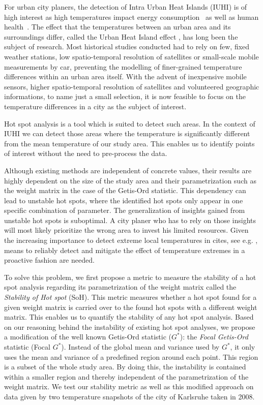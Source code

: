 \documentclass{itatnew}
\begin{document}
For urban city planers, the detection of Intra Urban Heat Islands (IUHI) is of
high interest as high temperatures impact energy
consumption~\cite{Hassid.2001.Electricity_UHI} as well as human
health~\cite{Ye.2012}. The effect that the temperatures between an urban area
and its surroundings differ, called the Urban Heat Island effect
\cite{Oke1982energetic}, has long been the subject of research. Most historical
studies conducted had to rely on few, fixed weather stations, low
spatio-temporal resolution of satellites or small-scale mobile measurements by
car, preventing the modelling of finer-grained temperature differences within an
urban area itself. With the advent of inexpensive mobile sensors, higher
spatio-temporal resolution of satellites and volunteered geographic
informations, to name just a small selection, it is now feasible to focus on the
temperature differences in a city as the subject of interest.

Hot spot analysis is a tool which is suited to detect such areas. In the context
of IUHI we can detect those areas where the temperature is significantly
different from the mean temperature of our study area. This enables us to
identify points of interest without the need to pre-process the data.

Although existing methods are independent of concrete values, their results are
highly dependent on the size of the study area and their parametrization such as
the weight matrix in the case of the Getis-Ord statistic. This dependency can
lead to unstable hot spots, where the identified hot spots only appear in one 
specific combination of parameter. The generalization of insights gained from
unstable hot spots is suboptimal. A city planer who has to rely on those
insights will most likely prioritize the wrong area to invest his limited
resources. Given the increasing importance to detect extreme local temperatures
in cites, see e.g. \cite{Hansen.2010, GRL:GRL22143, department2014world}, means
to reliably detect and mitigate the effect of temperature extremes in a
proactive fashion are needed.

To solve this problem, we first propose a metric to measure the stability of a
hot spot analysis regarding its parametrization of the weight matrix called the
\emph{Stability of Hot spot} (SoH). This metric measures whether a hot spot
found for a given weight matrix is carried over to the found hot spots with a
different weight matrix. This enables us to quantify the stability of any hot
spot analysis. Based on our reasoning behind the instability of existing hot
spot analyses, we propose a modification of the well known Getis-Ord statistic
($G^*$): the \emph{Focal Getis-Ord} statistic (Focal $G^*$). Instead of the
global mean and variance used by $G^*$, it only uses the mean and variance of a
predefined region around each point. This region is a subset of the whole study
area. By doing this, the instability is contained within a smaller region and
thereby independent of the parametrization of the weight matrix. We test our
stability metric as well as this modified approach on data given by two
temperature snapshots of the city of Karlsruhe taken in 2008.
\end{document}
